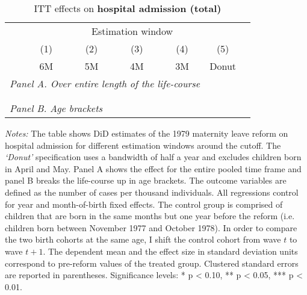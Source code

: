 \vspace*{\fill}
\begin{table}[H] \centering 
 \begin{threeparttable} \centering \caption{ITT effects on \textbf{hospital admission (total)}}\label{tab: DD_hopsital2_total}
  {\def\sym#1{\ifmmode^{#1}\else\(^{#1}\)\fi} 
 	\begin{tabular}{l*{6}{c}}
 		\toprule 
 		& \multicolumn{5}{c}{Estimation window} \\ 
 		\cmidrule(lr){2-6}
 		&\multicolumn{1}{c}{(1)}&\multicolumn{1}{c}{(2)}&\multicolumn{1}{c}{(3)}&\multicolumn{1}{c}{(4)}&\multicolumn{1}{c}{(5)}\\
 		&\multicolumn{1}{c}{6M}&\multicolumn{1}{c}{5M}&\multicolumn{1}{c}{4M}&\multicolumn{1}{c}{3M}&\multicolumn{1}{c}{Donut}\\
 		\midrule
 		\multicolumn{5}{l}{\emph{Panel A. Over entire length of the life-course}} \\
 		 \\ \\
 		\multicolumn{5}{l}{\emph{Panel B. Age brackets}} \\
 		    
 		\bottomrule 
 	\end{tabular}}
 	\begin{tablenotes} 
 		\item \scriptsize \emph{Notes:} The table shows DiD estimates of the 1979 maternity leave reform on hospital admission for different estimation windows around the cutoff. The \textit{`Donut'} specification uses a bandwidth of half a year and excludes children born in April and May. Panel A shows the effect for the entire pooled time frame and panel B breaks the life-course up in age brackets. The outcome variables are defined as the number of cases per thousand individuals. All regressions control for year and month-of-birth fixed effects. The control group is comprised of children that are born in the same months but one year before the reform (i.e. children born between November 1977 and October 1978). In order to compare the two birth cohorts at the same age, I shift the control cohort from wave $t$ to wave $t+1$. The dependent mean and the effect size in standard deviation units correspond to pre-reform values of the treated group. Clustered standard errors are reported in parentheses. \newline Significance levels: * p < 0.10, ** p < 0.05, *** p < 0.01. \newline 	%
 	\end{tablenotes} 
 \end{threeparttable} 
 \end{table}
\vspace*{\fill}\clearpage 